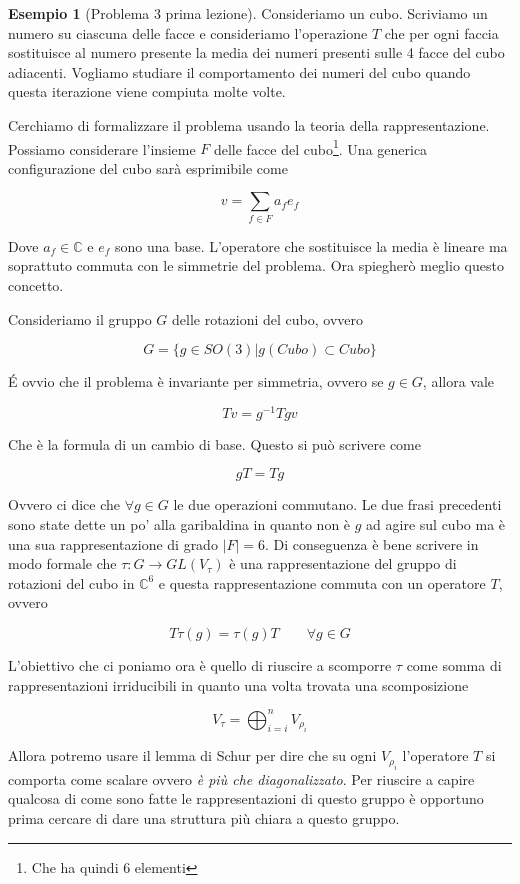 \documentclass[11pt]{article}
\theoremstyle{plain}
\theoremstyle{definition}
\newtheorem{exmp}{Esempio}[section]
\theoremstyle{remark}
\newcommand{\dsum}{\displaystyle\sum}
\begin{document}
\begin{exmp}[Problema 3 prima lezione]

Consideriamo un cubo. Scriviamo un numero su ciascuna delle facce e consideriamo l'operazione $T$ che per ogni faccia sostituisce al numero presente la media dei numeri presenti sulle 4 facce del cubo adiacenti. Vogliamo studiare il comportamento dei numeri del cubo quando questa iterazione viene compiuta molte volte.


Cerchiamo di formalizzare il problema usando la teoria della rappresentazione. Possiamo considerare l'insieme $F$ delle facce del cubo\footnote{Che ha quindi 6 elementi}. Una generica configurazione del cubo sarà esprimibile come

\[ v = \dsum_{f \in F} a_f e_f \]

Dove $a_f \in \mathbb{C}$ e $e_f$ sono una base. L'operatore che sostituisce la media è lineare ma soprattuto commuta con le simmetrie del problema. Ora spiegherò meglio questo concetto.

Consideriamo il gruppo $G$ delle rotazioni del cubo, ovvero

\[G = \{ g \in SO(3) | g(Cubo) \subset Cubo \} \]

\'E ovvio che il problema è invariante per simmetria, ovvero se $g \in G$, allora vale

\[ T v = g^{-1}T g v \]

Che è la formula di un cambio di base. Questo si può scrivere come

\[gT = Tg \]

Ovvero ci dice che $\forall g \in G$ le due operazioni commutano. Le due frasi precedenti sono state dette un po' alla garibaldina in quanto non è $g$ ad agire sul cubo ma è una sua rappresentazione di grado $|F| = 6$. Di conseguenza è bene scrivere in modo formale che $\tau: G \to GL(V_\tau)$ è una rappresentazione del gruppo di rotazioni del cubo in $\mathbb{C}^6$ e questa rappresentazione commuta con un operatore $T$, ovvero

\[T\tau(g) = \tau(g) T \qquad \forall g \in G  \]


L'obiettivo che ci poniamo ora è quello di riuscire a scomporre $\tau$ come somma di rappresentazioni irriducibili in quanto una volta trovata una scomposizione

\[ V_\tau = \bigoplus_{i = i}^n V_{\rho_i} \]

Allora potremo usare il lemma di Schur per dire che su ogni $V_{\rho_i}$ l'operatore $T$ si comporta come scalare ovvero \emph{è più che diagonalizzato}. Per riuscire a capire qualcosa di come sono fatte le rappresentazioni di questo gruppo è opportuno prima cercare di dare una struttura più chiara a questo gruppo.


\end{exmp}
\end{document}
